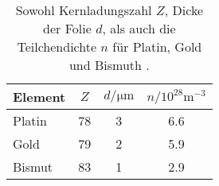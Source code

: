\begin{table}
\centering
   \caption{Sowohl Kernladungszahl $Z$, Dicke der Folie $d$, als auch die Teilchendichte $n$ für Platin, Gold und Bismuth \cite{Elemente16}.}
   \label{tab:zWerte}
    \begin{tabular}{lS[table-format=2.0]S[table-format=1.0]S[table-format=1.1]}
        \toprule
        {Element} & {$Z$} & {$d/\si{\micro\metre}$} & {$n/10^{28}\si{\metre^{-3}}$} \\
        \midrule
        {Platin} & 78 & 3 & 6.6  \\
        {Gold} & 79 & 2 & 5.9  \\
        {Bismut} & 83 & 1 & 2.9  \\
        \bottomrule
    \end{tabular}
\end{table}
